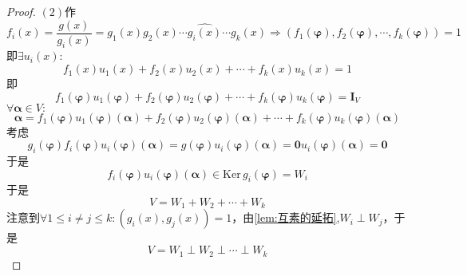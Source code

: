 {\begin{proof}
        $(2)$作\[
            f_i\left(x\right)=\frac{g\left(x\right)}{g_i\left(x\right)}=g_1\left(x\right)g_2\left(x\right)\cdots\widehat{g_i\left(x\right)}\cdots g_k\left(x\right)\Longrightarrow\left(
            f_1\left(\bm{\varphi}\right),f_2\left(\bm{\varphi}\right),\cdots, f_k\left(\bm{\varphi}\right)
            \right)=1
        \]即$\exists u_i\left(x\right):$\[
            f_1\left(x\right)u_1\left(x\right)+f_2\left(x\right)u_2\left(x\right)+\cdots+f_k\left(x\right)u_k\left(x\right)=1
        \]即\[
            f_1\left(\bm{\varphi}\right)u_1\left(\bm{\varphi}\right)+f_2\left(\bm{\varphi}\right)u_2\left(\bm{\varphi}\right)+\cdots+f_k\left(\bm{\varphi}\right)u_k\left(\bm{\varphi}\right)=\bm{I}_V
        \]$\forall\bm{\alpha}\in V:$\[
            \bm{\alpha}=f_1\left(\bm{\varphi}\right)u_1\left(\bm{\varphi}\right)\left(\bm{\alpha}\right)+f_2\left(\bm{\varphi}\right)u_2\left(\bm{\varphi}\right)\left(\bm{\alpha}\right)+\cdots+f_k\left(\bm{\varphi}\right)u_k\left(\bm{\varphi}\right)\left(\bm{\alpha}\right)
        \]考虑\[
            g_i\left(
            \bm{\varphi}
            \right)f_i\left(
            \bm{\varphi}
            \right)u_i\left(
            \bm{\varphi}
            \right)\left(
            \bm{\alpha}
            \right)=g\left(
            \bm{\varphi}
            \right)u_i\left(
            \bm{\varphi}
            \right)\left(
            \bm{\alpha}
            \right)=\bm{0}u_i\left(
            \bm{\varphi}
            \right)\left(\bm{\alpha}\right)=\bm{0}
        \]于是\[
            f_i\left(
            \bm{\varphi}
            \right)u_i\left(
            \bm{\varphi}
            \right)\left(
            \bm{\alpha}
            \right)\in \mathrm{Ker}\,g_i\left(
            \bm{\varphi}
            \right)=W_i
        \]于是\[
            V=W_1+W_2+\cdots+W_k
        \]
        注意到$\forall1\leqslant i\neq j\leqslant k:\left(g_i\left(x\right),g_j\left(x\right)\right)=1$，由\cref{lem:互素的延拓},$W_i\perp W_j$，于是\[
            V=W_1\perp W_2\perp\cdots\perp W_k
        \]


\end{proof}}
